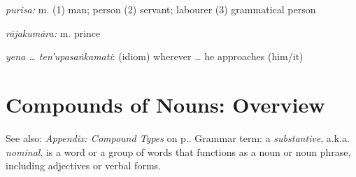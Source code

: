 \documentclass[11pt,oneside]{memoir}
\begin{document}
\emph{purisa:} m. (1) man; person (2) servant; labourer (3) grammatical person

\emph{rājakumāra:} m. prince

\emph{yena \ldots{} ten'upasaṅkamati}: (idiom) wherever \ldots{} he approaches (him/it)

\clearpage

\section{Compounds of Nouns: Overview}
\label{sec:orgcf8d393}

\label{compounds-overview}

{\footnotesize
See also: \emph{Appendix: Compound Types} on p.\pageref{compound-types}. Grammar
term: a \emph{substantive}, a.k.a. \emph{nominal}, is a word or a group of words that
functions as a noun or noun phrase, including adjectives or verbal forms.
}
\end{document}
